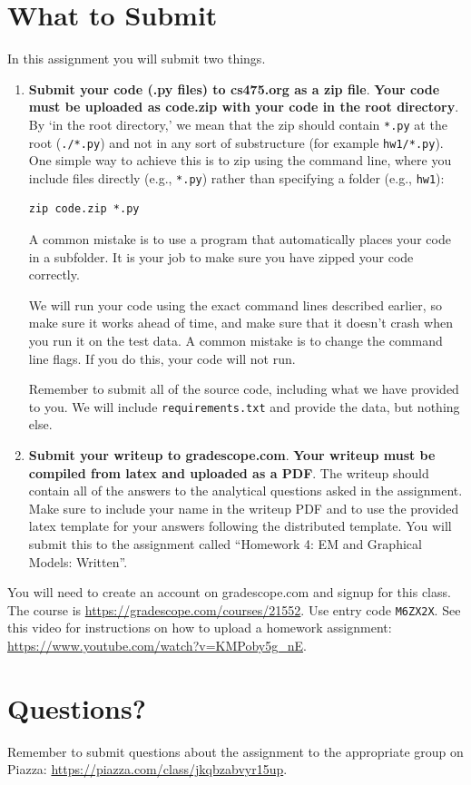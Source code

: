 \documentclass[11pt]{article}
\begin{document}
\newpage
\section{What to Submit}
In this assignment you will submit two things.
\begin{enumerate}
\item \textbf{Submit your code (.py files) to cs475.org as a zip file}. \textbf{Your code must be uploaded as code.zip with your code in the root directory}. By `in the root directory,' we mean that the zip should contain \texttt{*.py} at the root (\texttt{./*.py}) and not in any sort of substructure (for example \texttt{hw1/*.py}). One simple way to achieve this is to zip using the command line, where you include files directly (e.g., \texttt{*.py}) rather than specifying a folder (e.g., \texttt{hw1}):
\begin{verbatim}
zip code.zip *.py
\end{verbatim}

A common mistake is to use a program that automatically places your code in a subfolder. It is your job to make sure you have zipped your code correctly.

We will run your code using the exact command lines described earlier, so make sure it works ahead of time, and make sure that it doesn't crash when you run it on the test data. A common mistake is to change the command line flags. If you do this, your code will not run.

Remember to submit all of the source code, including what we have provided to you. We will include {\tt requirements.txt} and provide the data, but nothing else.

\item \textbf{Submit your writeup to gradescope.com}. \textbf{Your writeup must be compiled from latex and uploaded as a PDF}. The writeup should contain all of the answers to the analytical questions asked in the assignment. Make sure to include your name in the writeup PDF and to use the provided latex template for your answers following the distributed template. You will submit this to the assignment called ``Homework 4: EM and Graphical Models: Written''.


\end{enumerate}


You will need to create an account on gradescope.com and signup for this class. The course is \href{https://gradescope.com/courses/21552}{\url{https://gradescope.com/courses/21552}}. Use entry code {\tt M6ZX2X}. See this video for instructions on how to upload a homework assignment: \href{https://www.youtube.com/watch?v=KMPoby5g_nE}{\url{https://www.youtube.com/watch?v=KMPoby5g_nE}}.

\section{Questions?}
Remember to submit questions about the assignment to the appropriate group on Piazza: \href{https://piazza.com/class/jkqbzabvyr15up}{\url{https://piazza.com/class/jkqbzabvyr15up}}.
\end{document}
